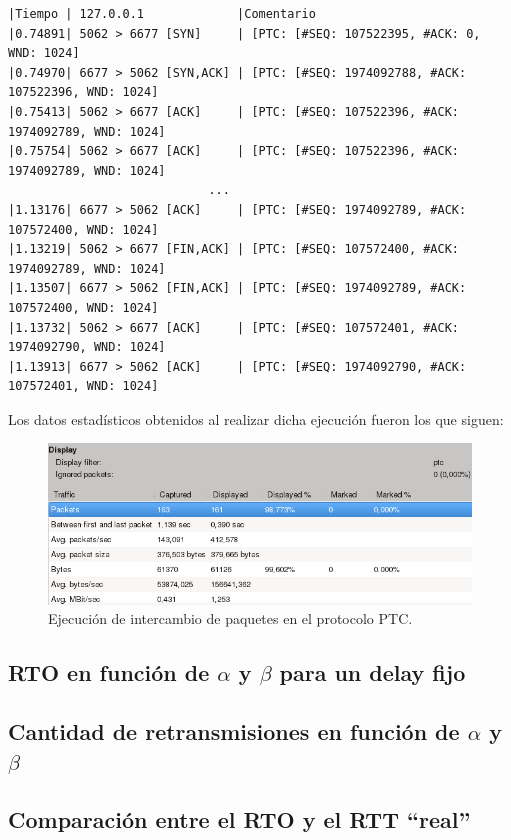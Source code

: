 \documentclass[10pt, a4paper]{article}
\begin{document}
\begin{verbatim}
|Tiempo | 127.0.0.1             |Comentario
|0.74891| 5062 > 6677 [SYN]     | [PTC: [#SEQ: 107522395, #ACK: 0, WND: 1024]
|0.74970| 6677 > 5062 [SYN,ACK] | [PTC: [#SEQ: 1974092788, #ACK: 107522396, WND: 1024]
|0.75413| 5062 > 6677 [ACK]     | [PTC: [#SEQ: 107522396, #ACK: 1974092789, WND: 1024]
|0.75754| 5062 > 6677 [ACK]     | [PTC: [#SEQ: 107522396, #ACK: 1974092789, WND: 1024]	
							...
|1.13176| 6677 > 5062 [ACK]     | [PTC: [#SEQ: 1974092789, #ACK: 107572400, WND: 1024]
|1.13219| 5062 > 6677 [FIN,ACK]	| [PTC: [#SEQ: 107572400, #ACK: 1974092789, WND: 1024]
|1.13507| 6677 > 5062 [FIN,ACK]	| [PTC: [#SEQ: 1974092789, #ACK: 107572400, WND: 1024]					
|1.13732| 5062 > 6677 [ACK]     | [PTC: [#SEQ: 107572401, #ACK: 1974092790, WND: 1024]
|1.13913| 6677 > 5062 [ACK]     | [PTC: [#SEQ: 1974092790, #ACK: 107572401, WND: 1024]
\end{verbatim}

Los datos estadísticos obtenidos al realizar dicha ejecución fueron los que siguen:

\begin{figure}[H]
\begin{center}
\includegraphics[width=16cm]{wireshark.png}
\caption{Ejecución de intercambio de paquetes en el protocolo PTC.}
\end{center}
\end{figure}


\subsection{RTO en función de $\alpha$ y $\beta$ para un delay fijo}

\subsection{Cantidad de retransmisiones en función de $\alpha$ y $\beta$}

\subsection{Comparación entre el RTO y el RTT ``real''}
\end{document}
